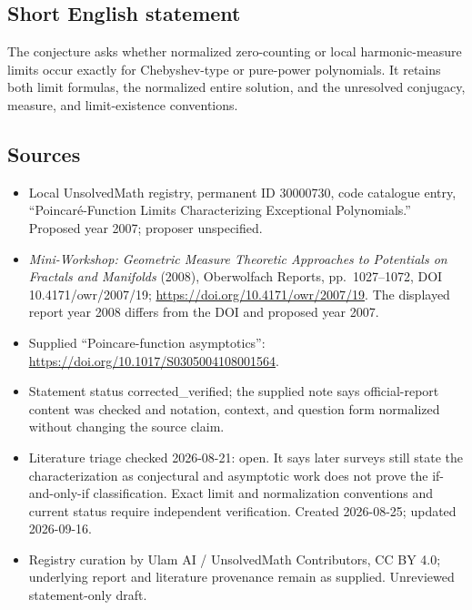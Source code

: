 \documentclass[11pt]{article}
\begin{document}
\subsection{Short English statement}
The conjecture asks whether normalized zero-counting or local harmonic-measure limits occur exactly for Chebyshev-type or pure-power polynomials. It retains both limit formulas, the normalized entire solution, and the unresolved conjugacy, measure, and limit-existence conventions.
\subsection{Sources}
\begin{itemize}
\item Local UnsolvedMath registry, permanent ID 30000730, code catalogue entry, ``Poincar\'e-Function Limits Characterizing Exceptional Polynomials.'' Proposed year 2007; proposer unspecified.
\item \emph{Mini-Workshop: Geometric Measure Theoretic Approaches to Potentials on Fractals and Manifolds} (2008), Oberwolfach Reports, pp.\ 1027--1072, DOI 10.4171/owr/2007/19; \url{https://doi.org/10.4171/owr/2007/19}. The displayed report year 2008 differs from the DOI and proposed year 2007.
\item Supplied ``Poincare-function asymptotics'': \url{https://doi.org/10.1017/S0305004108001564}.
\item Statement status corrected\_verified; the supplied note says official-report content was checked and notation, context, and question form normalized without changing the source claim.
\item Literature triage checked 2026-08-21: open. It says later surveys still state the characterization as conjectural and asymptotic work does not prove the if-and-only-if classification. Exact limit and normalization conventions and current status require independent verification. Created 2026-08-25; updated 2026-09-16.
\item Registry curation by Ulam AI / UnsolvedMath Contributors, CC BY 4.0; underlying report and literature provenance remain as supplied. Unreviewed statement-only draft.
\end{itemize}
\end{document}

